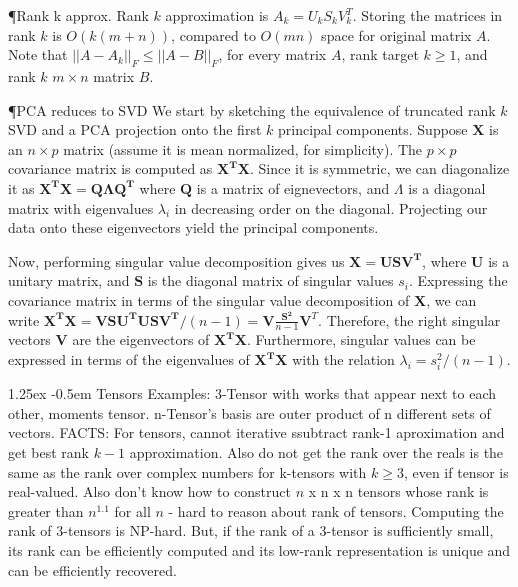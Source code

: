 \documentclass[8pt]{article}
\makeatletter
\newlength{\norm}
\newlength{\nrm}
\newlength{\sm}
\renewcommand{\paragraph}{%
  \@startsection{paragraph}{4}%
  {\z@}{1.25ex \@plus 2pt \@minus 2pt}{-0.5em}%
  {\fontsize{\f@size}{\nrm}\normalfont\bfseries}%
}
\makeatother
\begin{document}
  \P{Rank k approx.} Rank $k$ approximation is $A_k = U_k S_k V_k^T$.  Storing the matrices in rank $k$ is $O(k(m+n))$, compared to $O(mn)$ space for original matrix $A$.  Note that $||A - A_k||_F \leq ||A - B||_F$, for every matrix $A$, rank target $k \geq 1$, and rank $k$ $m \times n$ matrix $B$.


  \def\mbf{\mathbf}

  \P{PCA reduces to SVD} We start by sketching the equivalence of truncated rank $k$ SVD and a PCA projection onto the first $k$ principal components.  Suppose $\mathbf{X}$ is an $n \times p$ matrix (assume it is mean normalized, for simplicity).  The $p \times p$ covariance matrix is computed as $\mathbf{X^T X}$.  Since it is symmetric, we can diagonalize it as $\mbf{X^T X} = \mbf{Q \Lambda Q^T}$ where $\mbf{Q}$ is a matrix of eignevectors, and $\Lambda$ is a diagonal matrix with eigenvalues $\lambda_i$ in decreasing order on the diagonal.  Projecting our data onto these eigenvectors yield the principal components.

  Now, performing singular value decomposition gives us $\mathbf{X = USV^T}$, where $\mbf{U}$ is a unitary matrix, and $\mbf{S}$ is the diagonal matrix of singular values $s_i$.  Expressing the covariance matrix in terms of the singular value decomposition of $\mbf{X}$, we can write $\mbf{X^T X} = \mbf{VSU^T U S V^T} / (n-1) = \mbf{V} \frac{\mbf{S^2}}{n-1}\mbf{V}^T$. Therefore, the right singular vectors $\mbf{V}$ are the eigenvectors of $\mbf{X^T X}$.  Furthermore, singular values can be expressed in terms of the eigenvalues of $\mbf{X^T X}$ with the relation $\lambda_i = s_i^2 / (n-1)$.




\paragraph{Tensors} Examples: 3-Tensor with works that appear next to each other, moments tensor. n-Tensor's basis are outer product of n different sets of vectors. FACTS: For tensors, cannot iterative ssubtract rank-1 aproximation and get best rank $k-1$ approximation. Also do not get the rank over the reals is the same as the rank over complex numbers for k-tensors with $k \geq 3$, even if tensor is real-valued. Also don't know how to construct $n$ x n x n tensors whose rank is greater than $n^{1.1}$ for all $n$ - hard to reason about rank of tensors. Computing the rank of 3-tensors is NP-hard. But, if the rank of a 3-tensor is sufficiently small, its rank can be efficiently computed and its low-rank representation is unique and can be efficiently recovered.\\
\end{document}
